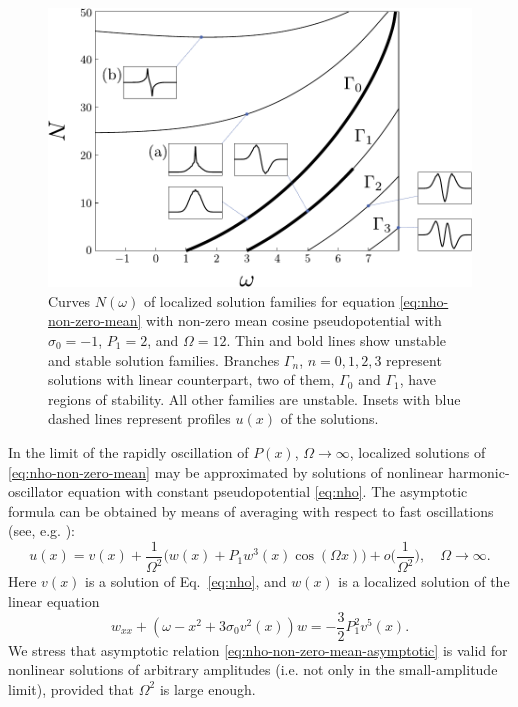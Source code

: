 \begin{figure}[h]
\centering
	\includegraphics[scale = 1]{pic/branches for cosine nho, case (b)}
	\caption{
		Curves $N(\omega)$ of localized solution families for equation \eqref{eq:nho-non-zero-mean} with non-zero mean cosine pseudopotential with $\sigma_0 = -1$, $P_1 = 2$, and $\Omega = 12$.
		Thin and bold lines show unstable and stable solution families.
		Branches $\Gamma_n$, $n = 0, 1, 2, 3$ represent solutions with linear counterpart, two of them, $\Gamma_0$ and $\Gamma_1$, have regions of stability.
		All other families are unstable.
		Insets with blue dashed lines represent profiles $u(x)$ of the solutions.
	}
\label{fig:branches-nho-periodic-repulsive}
\end{figure}

In the limit of the rapidly oscillation of $P(x)$, $\Omega \to \infty$, localized solutions of \eqref{eq:nho-non-zero-mean} may be approximated by solutions of nonlinear harmonic-oscillator equation with constant pseudopotential \eqref{eq:nho}.
The asymptotic formula can be obtained by means of averaging with respect to fast oscillations (see, e.g. \cite{AbdullaevCaputoKraenkelMalomed}):
\begin{equation}
	u(x) = v(x) + \frac{1}{\Omega^2} \bigg( w(x) + P_1 w^3(x) \cos (\Omega x) \bigg) + o \bigg( \frac{1}{\Omega^2} \bigg), \quad \Omega \to \infty.
\label{eq:nho-non-zero-mean-asymptotic}
\end{equation}
Here $v(x)$ is a solution of Eq.~\eqref{eq:nho}, and $w(x)$ is a localized solution of the linear equation
\begin{equation}
	w_{xx} + (\omega - x^2 + 3 \sigma_0 v^2(x)) w = -\frac{3}{2} P_1^2 v^5(x).
\end{equation}
We stress that asymptotic relation \eqref{eq:nho-non-zero-mean-asymptotic} is valid for nonlinear solutions of arbitrary amplitudes (i.e. not only in the small-amplitude limit), provided that $\Omega^2$ is large enough.

